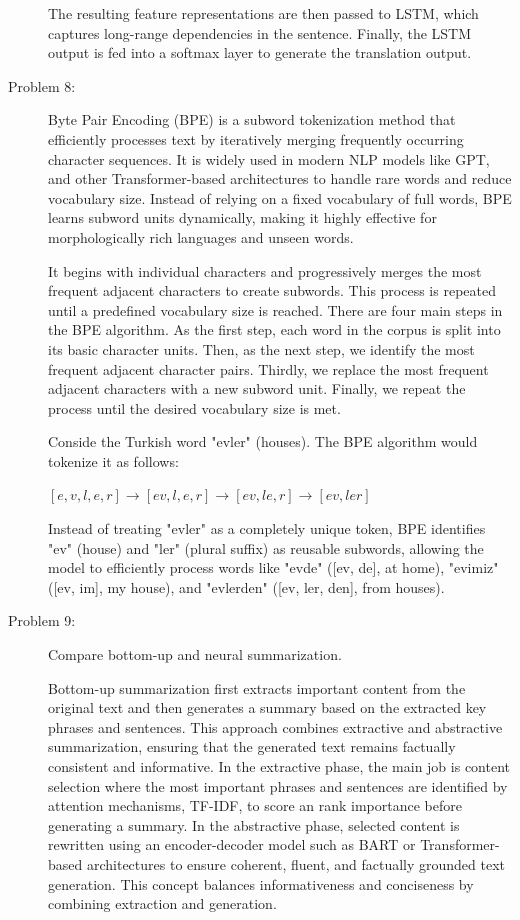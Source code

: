 \documentclass[10pt]{article}
\begin{document}
\begin{description}
The resulting feature representations are then passed to LSTM, which captures long-range dependencies in the sentence.
Finally, the LSTM output is fed into a softmax layer to generate the translation output.

\pagebreak

\item[Problem 8:]  \hfill %

Byte Pair Encoding (BPE) is a subword tokenization method that efficiently processes text by iteratively merging frequently occurring character sequences. 
It is widely used in modern NLP models like GPT, and other Transformer-based architectures to handle rare words and reduce vocabulary size. 
Instead of relying on a fixed vocabulary of full words, BPE learns subword units dynamically, making it highly effective for morphologically rich languages and unseen words.

It begins with individual characters and progressively merges the most frequent adjacent characters to create subwords. 
This process is repeated until a predefined vocabulary size is reached. There are four main steps in the BPE algorithm.
As the first step, each word in the corpus is split into its basic character units. Then, as the next step, we identify the most frequent adjacent character pairs.
Thirdly, we replace the most frequent adjacent characters with a new subword unit.
Finally, we repeat the process until the desired vocabulary size is met.

Conside the Turkish word "evler" (houses). The BPE algorithm would tokenize it as follows:

\begin{center}
    $[e, v, l, e, r] \rightarrow [ev, l, e, r] \rightarrow [ev, le, r] \rightarrow [ev, ler]$
\end{center}

Instead of treating "evler" as a completely unique token, BPE identifies "ev" (house) and "ler" (plural suffix) as reusable subwords, 
allowing the model to efficiently process words like "evde" ([ev, de], at home), "evimiz" ([ev, im], my house), and "evlerden" ([ev, ler, den], from houses).

\pagebreak

\item[Problem 9:]  Compare bottom-up and neural summarization.

Bottom-up summarization first extracts important content from the original text and then generates a summary based on the extracted key phrases and sentences.
This approach combines extractive and abstractive summarization, ensuring that the generated text remains factually consistent and informative.
In the extractive phase, the main job is content selection where the most important phrases and sentences are identified by attention mechanisms, 
TF-IDF, to score an rank importance before generating a summary.
In the abstractive phase, selected content is rewritten using an encoder-decoder model such as BART or Transformer-based architectures 
to ensure coherent, fluent, and factually grounded text generation.
This concept balances informativeness and conciseness by combining extraction and generation.


\end{description}
\end{document}
